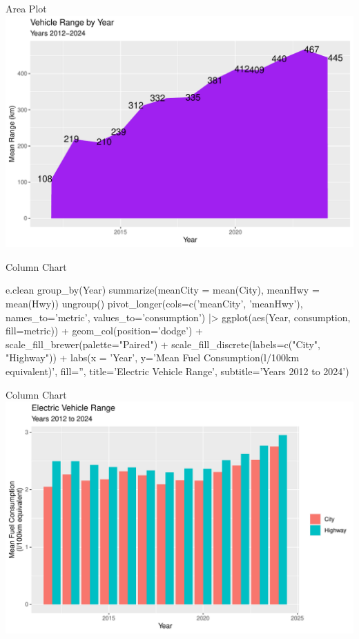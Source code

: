 \documentclass[ignorenonframetext,xcolor=x11names]{beamer}
\begin{document}
\begin{frame}{Area Plot}
  \includegraphics[width=\textwidth]{fuel.areaOneSeries.pdf}
\end{frame}

\begin{frame}[fragile]{Column Chart}
\scriptsize
\begin{Rcode}
e.clean %
   group_by(Year) %
   summarize(meanCity = mean(City), meanHwy = mean(Hwy)) %
   ungroup() %
   pivot_longer(cols=c('meanCity', 'meanHwy'), 
                names_to='metric', 
                values_to='consumption') |>
   ggplot(aes(Year, consumption, fill=metric)) +
      geom_col(position='dodge') +
      scale_fill_brewer(palette="Paired") +
      scale_fill_discrete(labels=c("City", "Highway")) + 
      labs(x = 'Year', 
           y='Mean Fuel Consumption\n(l/100km equivalent)', 
           fill='', 
           title='Electric Vehicle Range', 
           subtitle='Years 2012 to 2024')
\end{Rcode}
\end{frame}

\begin{frame}{Column Chart}
  \includegraphics[width=\textwidth]{fuel.columns.pdf}
\end{frame}
\end{document}
